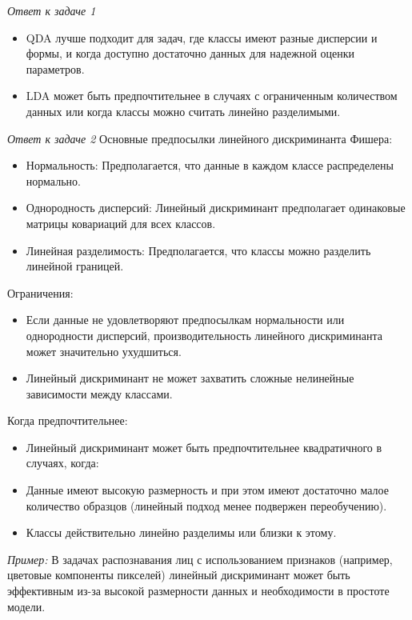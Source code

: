 \textit{Ответ к задаче 1}
\begin{itemize}
    \item QDA лучше подходит для задач, где классы имеют разные дисперсии и формы, и когда доступно достаточно данных для надежной оценки параметров.

    \item LDA может быть предпочтительнее в случаях с ограниченным количеством данных или когда классы можно считать линейно разделимыми.
\end{itemize}

\textit{Ответ к задаче 2}
Основные предпосылки линейного дискриминанта Фишера:
\begin{itemize}
    \item Нормальность: Предполагается, что данные в каждом классе распределены нормально.

    \item Однородность дисперсий: Линейный дискриминант предполагает одинаковые матрицы ковариаций для всех классов.

    \item Линейная разделимость: Предполагается, что классы можно разделить линейной границей.
\end{itemize}
Ограничения:
\begin{itemize}
    \item Если данные не удовлетворяют предпосылкам нормальности или однородности дисперсий, производительность линейного дискриминанта может значительно ухудшиться.

    \item Линейный дискриминант не может захватить сложные нелинейные зависимости между классами.
\end{itemize}
Когда предпочтительнее:
\begin{itemize}
    \item Линейный дискриминант может быть предпочтительнее квадратичного в случаях, когда:

    \item Данные имеют высокую размерность и при этом имеют достаточно малое количество образцов (линейный подход менее подвержен переобучению).

    \item Классы действительно линейно разделимы или близки к этому.
\end{itemize}
\textit{Пример:} В задачах распознавания лиц с использованием признаков (например, цветовые компоненты пикселей) линейный дискриминант может быть эффективным из-за высокой размерности данных и необходимости в простоте модели.

